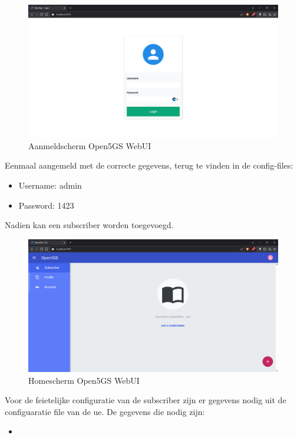\begin{figure}[h]
    \includegraphics[width=\linewidth]{../graphics/POC-WebUI-Login.png}
    \caption{Aanmeldscherm Open5GS WebUI }
    \label{fig:Aanmeld WebUI}
\end{figure}

Eenmaal aangemeld met de correcte gegevens, terug te vinden in de config-files:


\begin{itemize}
    \item Username: admin
    \item Password: 1423
\end{itemize}

Nadien kan een  subscriber worden toegevoegd.

\begin{figure}[h]
    \includegraphics[width=\linewidth]{../graphics/POC-WebUI-home.png}
    \caption{Homescherm Open5GS WebUI }
    \label{fig:Home WebUI}
\end{figure}

Voor de feietelijke configuratie van de subscriber zijn er gegevens nodig uit de configuaratie file van de \gls{ue}. De gegevens die nodig zijn:

\begin{itemize}
    \item 
\end{itemize}





